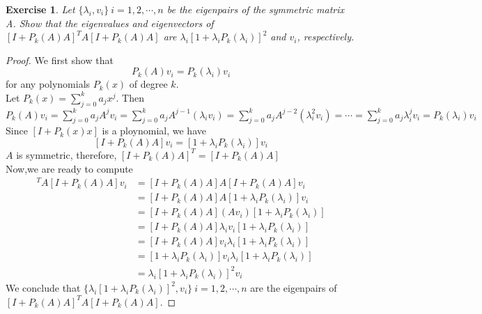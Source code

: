 \documentclass[11pt,a4paper]{article}
\renewcommand{\(}{\left(}
\renewcommand{\)}{\right)}
\newtheorem{exercise}{Exercise}
\begin{document}
  \setcounter{exercise}{6}
  
  \begin{exercise}
  Let $\lbrace \lambda_i,v_i \rbrace ~ i=1,2,\cdots,n$ be the eigenpairs of the symmetric matrix A. Show that the eigenvalues and eigenvectors of $[I+P_k(A)A]^TA[I+P_k(A)A]$ are $\lambda_i[1+\lambda_iP_k(\lambda_i)]^2$ and $v_i$, respectively.
  \end{exercise}  
  \begin{proof}
 We first show that
 \[ P_k(A)v_i = P_k(\lambda_i)v_i\]
 for any polynomials $P_k(x)$ of degree $k$.\\
 Let $\displaystyle P_k(x) = \sum_{j=0}^k a_jx^j$. Then\\
 $\displaystyle P_k(A)v_i=\sum_{j=0}^k a_jA^jv_i=\sum_{j=0}^k a_j A^{j-1}(\lambda_iv_i)=\sum_{j=0}^k a_j A^{j-2} (\lambda_i^2v_i) = \cdots =\sum_{j=0}^k a_j \lambda_i^jv_i = P_k(\lambda_i)v_i $\\
 Since $[I+P_k(x)x]$ is a ploynomial, we have
 \[ [I+P_k(A)A]v_i = [1+\lambda_iP_k(\lambda_i)]v_i\]
 $A$ is symmetric, therefore, $[I+P_k(A)A]^T=[I+P_k(A)A]$\\
 Now,we are ready to compute\\
 \begin{align*}
 [I+P_k(A)A]^TA[I+P_k(A)A]v_i &=[I+P_k(A)A]A[I+P_k(A)A]v_i\\
 &=[I+P_k(A)A]A[1+\lambda_iP_k(\lambda_i)]v_i\\
 &=[I+P_k(A)A](Av_i)[1+\lambda_iP_k(\lambda_i)]\\
 &=[I+P_k(A)A]\lambda_iv_i[1+\lambda_iP_k(\lambda_i)]\\
 &=[I+P_k(A)A]v_i\lambda_i[1+\lambda_iP_k(\lambda_i)]\\
 &=[1+\lambda_iP_k(\lambda_i)]v_i\lambda_i[1+\lambda_iP_k(\lambda_i)]\\
 &=\lambda_i[1+\lambda_iP_k(\lambda_i)]^2 v_i
 \end{align*}
 We conclude that $\lbrace \lambda_i[1+\lambda_iP_k(\lambda_i)]^2,v_i \rbrace ~ i=1,2,\cdots,n$
 are the eigenpairs of \\
 $[I+P_k(A)A]^TA[I+P_k(A)A]$.
\end{proof}
  
\end{document}
